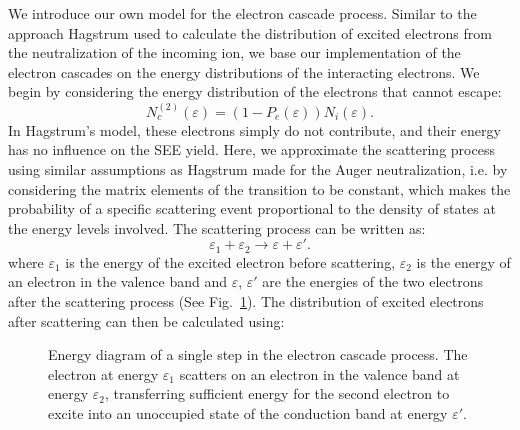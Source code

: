 \begin{refsection}
We introduce our own model for the electron cascade process. Similar to the 
approach Hagstrum used to calculate the distribution of excited electrons from 
the neutralization of the incoming ion, we base our implementation of the 
electron cascades on the energy distributions of the interacting electrons. We 
begin by considering the energy distribution of the electrons that cannot 
escape: 
\begin{equation} 
N_c^{(2)}(\varepsilon) = (1-P_e(\varepsilon))N_i(\varepsilon). 
\end{equation} 
In Hagstrum's model, these electrons simply do not contribute, and their 
energy has no influence on the SEE yield. Here, we approximate the scattering 
process using similar assumptions as Hagstrum made for the Auger 
neutralization, i.e. by considering the matrix elements of the transition to 
be constant, which makes the probability of a specific scattering event 
proportional to the density of states at the energy levels involved. The 
scattering process can be written as: 
\begin{equation}\label{quotas:eq-scattering} 
\varepsilon_1 + \varepsilon_2 \rightarrow \varepsilon + \varepsilon'. 
\end{equation} 
where $\varepsilon_1$ is the energy of the excited electron before scattering, 
$\varepsilon_2$ is the energy of an electron in the valence band and 
$\varepsilon$, $\varepsilon'$ are the energies of the two electrons after the 
scattering process (See Fig.~\ref{quotas:fig-cascades}). The distribution of 
excited electrons after scattering can then be calculated using: 

\begin{figure}[ht] 
\centering 
 
\caption{\label{quotas:fig-cascades}Energy diagram of a single step in the 
electron cascade process. The electron at energy $\varepsilon_1$ scatters on 
an electron in the valence band at energy $\varepsilon_2$, transferring 
sufficient energy for the second electron to excite into an unoccupied state 
of the conduction band at energy $\varepsilon'$.} 
\end{figure} 


\end{refsection}
